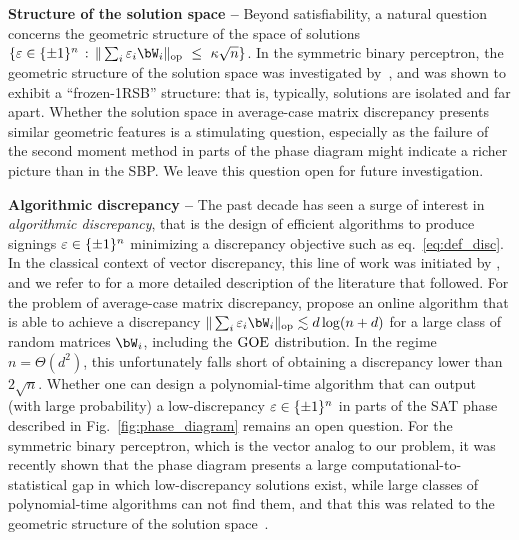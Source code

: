 \myskip
\textbf{Structure of the solution space --}
Beyond satisfiability, a natural question
concerns
the geometric structure 
of the space of solutions $\{\eps \in \{\pm 1\}^n \, : \, \|\sum_i \eps_i \bW_i\|_\op~\leq~\kappa \sqrt{n}\}$.
In the symmetric binary perceptron, the geometric structure of the solution space was investigated by~\cite{aubin2019storage,perkins2021frozen,abbe2022proof},
and was shown to exhibit a ``frozen-1RSB'' structure: that is, typically, solutions are isolated and far apart.
Whether the solution space in average-case matrix discrepancy presents similar geometric features is a stimulating question, especially as the failure of the second moment method in parts of the phase diagram might indicate a richer picture than in the SBP.
We leave this question open for future investigation.

\myskip 
\textbf{Algorithmic discrepancy --}
The past decade has seen a surge of interest in \emph{algorithmic discrepancy}, that is the design of efficient algorithms to produce signings 
$\varepsilon \in \{\pm 1\}^n$ minimizing a discrepancy objective such as eq.~\eqref{eq:def_disc}. 
In the classical context of vector discrepancy, this line of work was initiated by \cite{bansal2010constructive}, and we refer to \cite{bansal2023resolving,kunisky2023online} for a more detailed description of the 
literature that followed.
For the problem of average-case matrix discrepancy, \cite{kunisky2023online} propose an online algorithm that is able to achieve a discrepancy
$\|\sum_i \eps_i \bW_i\|_\op \lesssim d \log(n+d)$ for a large class of random matrices $\bW_i$, including the $\mathrm{GOE}$ distribution.
In the regime $n = \Theta(d^2)$, this unfortunately falls short of obtaining a discrepancy lower than $2 \sqrt{n}$. 
Whether one can design a polynomial-time algorithm that can output (with large probability) a low-discrepancy $\varepsilon \in \{\pm 1\}^n$ in parts of the SAT phase described in Fig.~\ref{fig:phase_diagram} 
remains an open question. 
For the symmetric binary perceptron, which is the vector analog to our problem, it was recently shown that the phase diagram presents a large computational-to-statistical gap
in which low-discrepancy solutions exist, while large classes of polynomial-time algorithms can not find them, and that this was related to the geometric structure of the solution space~\citep{bansal2020line,gamarnik2022algorithms}.
